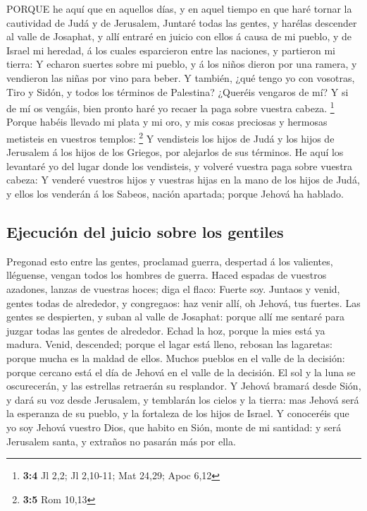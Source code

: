  PORQUE he aquí que en aquellos días, y en aquel tiempo en
que haré tornar la cautividad de Judá y de Jerusalem, 
Juntaré todas las gentes, y harélas descender al valle de Josaphat, y
allí entraré en juicio con ellos á causa de mi pueblo, y de Israel mi
heredad, á los cuales esparcieron entre las naciones, y partieron mi
tierra:  Y echaron suertes sobre mi pueblo, y á los niños
dieron por una ramera, y vendieron las niñas por vino para beber.
 Y también, ¿qué tengo yo con vosotras, Tiro y Sidón, y
todos los términos de Palestina? ¿Queréis vengaros de mí? Y si de mí os
vengáis, bien pronto haré yo recaer la paga sobre vuestra cabeza.
\footnote{\textbf{3:4} Jl 2,2; Jl 2,10-11; Mat 24,29; Apoc 6,12}
 Porque habéis llevado mi plata y mi oro, y mis cosas
preciosas y hermosas metisteis en vuestros templos: \footnote{\textbf{3:5}
  Rom 10,13}  Y vendisteis los hijos de Judá y los hijos de
Jerusalem á los hijos de los Griegos, por alejarlos de sus términos.
 He aquí los levantaré yo del lugar donde los vendisteis, y
volveré vuestra paga sobre vuestra cabeza:  Y venderé
vuestros hijos y vuestras hijas en la mano de los hijos de Judá, y ellos
los venderán á los Sabeos, nación apartada; porque Jehová ha hablado.

\hypertarget{ejecuciuxf3n-del-juicio-sobre-los-gentiles}{%
\subsection{Ejecución del juicio sobre los
gentiles}\label{ejecuciuxf3n-del-juicio-sobre-los-gentiles}}

 Pregonad esto entre las gentes, proclamad guerra, despertad
á los valientes, lléguense, vengan todos los hombres de guerra.
 Haced espadas de vuestros azadones, lanzas de vuestras
hoces; diga el flaco: Fuerte soy.  Juntaos y venid, gentes
todas de alrededor, y congregaos: haz venir allí, oh Jehová, tus
fuertes.  Las gentes se despierten, y suban al valle de
Josaphat: porque allí me sentaré para juzgar todas las gentes de
alrededor.  Echad la hoz, porque la mies está ya madura.
Venid, descended; porque el lagar está lleno, rebosan las lagaretas:
porque mucha es la maldad de ellos.  Muchos pueblos en el
valle de la decisión: porque cercano está el día de Jehová en el valle
de la decisión.  El sol y la luna se oscurecerán, y las
estrellas retraerán su resplandor.  Y Jehová bramará desde
Sión, y dará su voz desde Jerusalem, y temblarán los cielos y la tierra:
mas Jehová será la esperanza de su pueblo, y la fortaleza de los hijos
de Israel.  Y conoceréis que yo soy Jehová vuestro Dios,
que habito en Sión, monte de mi santidad: y será Jerusalem santa, y
extraños no pasarán más por ella.


